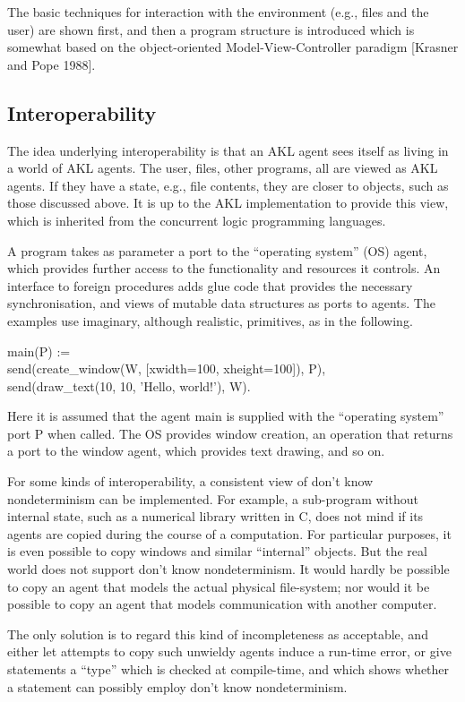 The basic techniques for interaction with the environment (e.g., files
and the user) are shown first, and then a program structure is
introduced which is somewhat based on the object-oriented
Model-View-Controller paradigm [Krasner and Pope 1988].

\subsection{Interoperability}

The idea underlying interoperability is that an AKL agent sees itself
as living in a world of AKL agents.  The user, files, other programs,
all are viewed as AKL agents.  If they have a state, e.g., file
contents, they are closer to objects, such as those discussed
above.  It is up to the AKL implementation to provide this view, which
is inherited from the concurrent logic programming languages.

A program takes as parameter a port to the ``operating system'' (OS)
agent, which provides further access to the functionality and
resources it controls.  An interface to foreign procedures adds glue
code that provides the necessary synchronisation, and views of mutable
data structures as ports to agents.  The examples use imaginary,
although realistic, primitives, as in the following.
%
\begin{program}
main(P) := \\
\>\>	send(create_window(W, [xwidth=100, xheight=100]), P), \\
\>\>	send(draw_text(10, 10, 'Hello, world!'), W).
\end{program}%
%
Here it is assumed that the agent main is supplied with the
``operating system'' port P when called.  The OS provides window
creation, an operation that returns a port to the window agent, which
provides text drawing, and so on.

For some kinds of interoperability, a consistent view of don't know
nondeterminism can be implemented.  For example, a sub-program without
internal state, such as a numerical library written in C, does not
mind if its agents are copied during the course of a computation.  For
particular purposes, it is even possible to copy windows and similar
``internal'' objects.  But the real world does not support don't know
nondeterminism.  It would hardly be possible to copy an agent that
models the actual physical file-system; nor would it be possible to
copy an agent that models communication with another computer.

The only solution is to regard this kind of incompleteness as
acceptable, and either let attempts to copy such unwieldy agents
induce a run-time error, or give statements a ``type'' which is
checked at compile-time, and which shows whether a statement can
possibly employ don't know nondeterminism.

